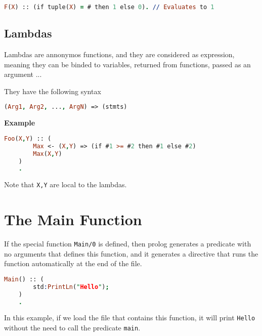 \begin{lstlisting}[language = Prolog]
    F(X) :: (if tuple(X) = # then 1 else 0). // Evaluates to 1
\end{lstlisting}



\subsection{Lambdas}

Lambdas are annonymos functions, and they are considered as 
expression, meaning they can be binded to variables, returned 
from functions, passed as an argument ...

They have the following syntax


\begin{lstlisting}[language = Prolog]
    (Arg1, Arg2, ..., ArgN) => (stmts)
\end{lstlisting}

\textbf{Example}

\begin{lstlisting}[language = Prolog]
    Foo(X,Y) :: (
        Max <- (X,Y) => (if #1 >= #2 then #1 else #2)
        Max(X,Y)
    )
    .
\end{lstlisting}

Note that \texttt{X,Y} are local to the lambdas.


\section{The Main Function}

If the special function \texttt{Main/0} is defined, then prolog generates
a predicate with no arguments that defines this function, and it generates 
a directive that runs the function automatically at the end of the file. 


\begin{lstlisting}[language = Prolog]
    Main() :: (
        std:PrintLn("Hello");
    )
    .
\end{lstlisting}

In this example, if we load the file that contains this function, it will print \texttt{Hello} without
the need to call the predicate \texttt{main}.
